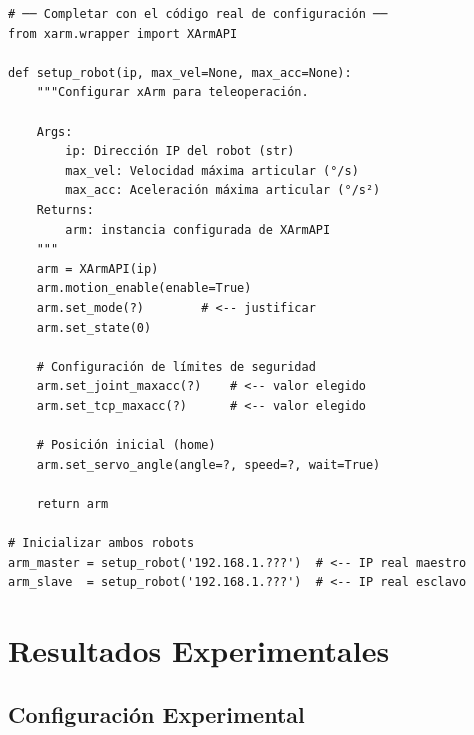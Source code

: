 \documentclass[journal,10pt,twoside]{IEEEtran}
\begin{document}
\begin{lstlisting}[caption={Configuración inicial de los xArm — Completar con su implementación},
                   label={lst:setup}]
# ── Completar con el código real de configuración ──
from xarm.wrapper import XArmAPI

def setup_robot(ip, max_vel=None, max_acc=None):
    """Configurar xArm para teleoperación.
    
    Args:
        ip: Dirección IP del robot (str)
        max_vel: Velocidad máxima articular (°/s)
        max_acc: Aceleración máxima articular (°/s²)
    Returns:
        arm: instancia configurada de XArmAPI
    """
    arm = XArmAPI(ip)
    arm.motion_enable(enable=True)
    arm.set_mode(?)        # <-- justificar
    arm.set_state(0)
    
    # Configuración de límites de seguridad
    arm.set_joint_maxacc(?)    # <-- valor elegido
    arm.set_tcp_maxacc(?)      # <-- valor elegido
    
    # Posición inicial (home)
    arm.set_servo_angle(angle=?, speed=?, wait=True)
    
    return arm

# Inicializar ambos robots
arm_master = setup_robot('192.168.1.???')  # <-- IP real maestro
arm_slave  = setup_robot('192.168.1.???')  # <-- IP real esclavo
\end{lstlisting}

\section{Resultados Experimentales}
\label{sec:experiments}

\subsection{Configuración Experimental}
\end{document}
